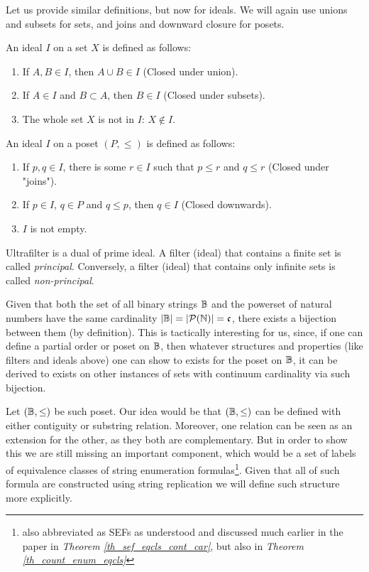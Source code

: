 Let us provide similar definitions, but now for ideals. We will again use unions and subsets for sets, and joins and downward closure for posets.

\begin{definition}\label{def_ideal_sets}
An ideal $I$ on a set $X$ is defined as follows:
\begin{enumerate}
\item If $A,B \in I$, then $A \cup B \in I$ (Closed under union).
\item If $A \in I$ and $B \subset A$, then $B \in I$ (Closed under subsets).
\item The whole set $X$ is not in $I$: $X \notin I$.
\end{enumerate}
\end{definition}

\begin{definition}\label{def_ideal_posets}
An ideal $I$ on a poset $(P,\leq)$ is defined as follows:
\begin{enumerate}
\item If $p,q \in I$, there is some $r \in I$ such that $p \leq r$ and $q \leq r$ (Closed under "joins").
\item If $p \in I$, $q \in P$ and $q \leq p$, then $q \in I$ (Closed downwards).
\item $I$ is not empty.
\end{enumerate}
\end{definition}

Ultrafilter is a dual of prime ideal. A filter (ideal) that contains a finite set is called \textit{principal}. Conversely, a filter (ideal) that contains only infinite sets is called \textit{non-principal}.


Given that both the set of all binary strings $\mathbb{B}$ and the powerset of natural numbers have the same cardinality $|\mathbb{B}| = |\mathcal{P}(\mathbb{N})| = \mathfrak{c}$, there exists a bijection between them (by definition). This is tactically interesting for us, since, if one can define a partial order or poset on $\mathbb{B}$, then whatever structures and properties (like filters and ideals above) one can show to exists for the poset on $\mathbb{B}$, it can be derived to exists on other instances of sets with continuum cardinality via such bijection.

Let $(\mathbb{B}, \leq)$ be such poset. Our idea would be that $(\mathbb{B}, \leq)$ can be defined with either contiguity or substring relation. Moreover, one relation can be seen as an extension for the other, as they both are complementary. But in order to show this we are still missing an important component, which would be a set of labels of equivalence classes of string enumeration formulas\footnote{also abbreviated as SEFs as understood and discussed much earlier in the paper in \textit{Theorem \ref{th_sef_eqcls_cont_car}}, but also in \textit{Theorem \ref{th_count_enum_eqcls}} }. Given that all of such formula are constructed using string replication we will define such structure more explicitly. 

